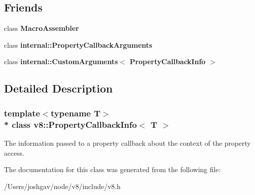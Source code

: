 \subsection*{Friends}
\begin{DoxyCompactItemize}
\item 
class {\bfseries Macro\+Assembler}\hypertarget{classv8_1_1_property_callback_info_ae605ff1d9d93250ace8a0a8b8d1dee67}{}\label{classv8_1_1_property_callback_info_ae605ff1d9d93250ace8a0a8b8d1dee67}

\item 
class {\bfseries internal\+::\+Property\+Callback\+Arguments}\hypertarget{classv8_1_1_property_callback_info_a1ba96a1268a72c23f50314cd99c76f1b}{}\label{classv8_1_1_property_callback_info_a1ba96a1268a72c23f50314cd99c76f1b}

\item 
class {\bfseries internal\+::\+Custom\+Arguments$<$ Property\+Callback\+Info $>$}\hypertarget{classv8_1_1_property_callback_info_ad1d1e15ddaed2ab44e8f21c5564881ba}{}\label{classv8_1_1_property_callback_info_ad1d1e15ddaed2ab44e8f21c5564881ba}

\end{DoxyCompactItemize}


\subsection{Detailed Description}
\subsubsection*{template$<$typename T$>$\\*
class v8\+::\+Property\+Callback\+Info$<$ T $>$}

The information passed to a property callback about the context of the property access. 

The documentation for this class was generated from the following file\+:\begin{DoxyCompactItemize}
\item 
/\+Users/joshgav/node/v8/include/v8.\+h\end{DoxyCompactItemize}

